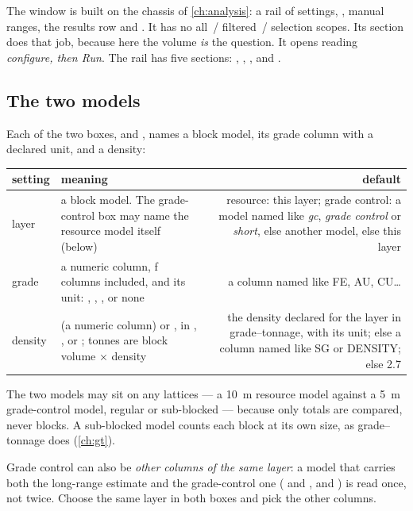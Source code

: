 The window is built on the chassis of \cref{ch:analysis}: a rail of settings, , manual ranges, the results row and . It has no all~/ filtered~/ selection scopes. Its  section does that job, because here the volume \emph{is} the question. It opens reading \emph{configure, then Run}. The rail has five sections: , , ,  and .

\subsection{The two models}\label{sec:factors-models}
Each of the two boxes,  and , names a block model, its grade column with a declared unit, and a density:

\begin{center}\small
\begin{tabularx}{\linewidth}{@{}lMD@{}}\toprule
setting & meaning & default \\ \midrule
layer & a block model. The grade-control box may name the resource model itself (below) & resource: this layer; grade control: a model named like \emph{gc}, \emph{grade control} or \emph{short}, else another model, else this layer \\
grade & a numeric column, ƒ columns included, and its unit: \ui{\%}, , ,  or none & a column named like FE, AU, CU… \\
density &  (a numeric column) or , in , ,  or ; tonnes are block volume × density & the density declared for the layer in grade–tonnage, with its unit; else a column named like SG or DENSITY; else 2.7 \\ \bottomrule
\end{tabularx}
\end{center}

The two models may sit on any lattices — a 10~m resource model against a 5~m grade-control model, regular or sub-blocked — because only totals are compared, never blocks. A sub-blocked model counts each block at its own size, as grade–tonnage does (\cref{ch:gt}).

Grade control can also be \emph{other columns of the same layer}: a model that carries both the long-range estimate and the grade-control one ( and ,  and ) is read once, not twice. Choose the same layer in both boxes and pick the other columns.

